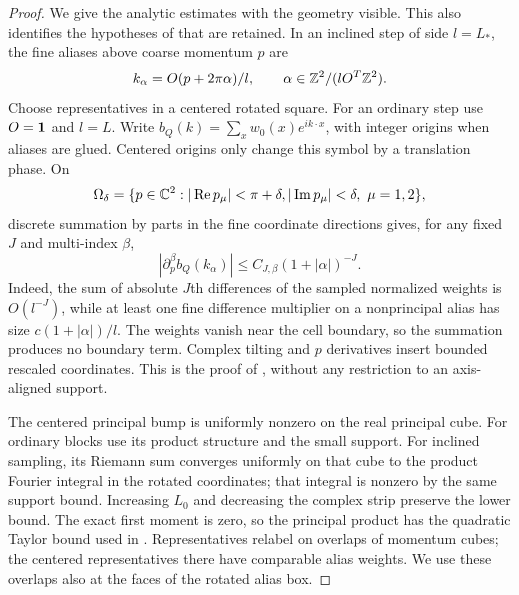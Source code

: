 \begin{proof}
We give the analytic estimates with the geometry visible.  This also
identifies the hypotheses of  that are retained.
In an inclined step of side $l=L_*$, the fine aliases above coarse
momentum $p$ are
\[
 k_\alpha=O(p+2\pi\alpha)/l,
 \qquad \alpha\in\mathbb Z^2/(lO^T\mathbb Z^2).
\]
Choose representatives in a centered rotated square.  For an ordinary
step use $O=\mathbf 1$ and $l=L$.  Write
$b_Q(k)=\sum_xw_0(x)e^{ik\cdot x}$, with integer origins when aliases
are glued.  Centered origins only change this symbol by a translation
phase.  On
\[
 \Omega_\delta=\{p\in\C^2:
       |\operatorname{Re}p_\mu|<\pi+\delta,       |\operatorname{Im}p_\mu|<\delta,\ \mu=1,2\},
\]
discrete summation by parts in the fine coordinate directions gives,
for any fixed $J$ and multi-index $\beta$,
\begin{equation}
 |\partial_p^\beta b_Q(k_\alpha)|
 \le C_{J,\beta}(1+|\alpha|)^{-J}.
 \label{eq:free-bump-decay}
\end{equation}
Indeed, the sum of absolute $J$th differences of the sampled normalized
weights is $O(l^{-J})$, while at least one fine difference multiplier
on a nonprincipal alias has size $c(1+|\alpha|)/l$.  The weights vanish
near the cell boundary, so the summation produces no boundary term.
Complex tilting and $p$ derivatives insert bounded rescaled coordinates.
This is the proof of , without any restriction to
an axis-aligned support.

The centered principal bump is uniformly nonzero on the real principal
cube.  For ordinary blocks use its product structure and the small
support.  For inclined sampling, its Riemann sum converges uniformly on
that cube to the product Fourier integral in the rotated coordinates;
that integral is nonzero by the same support bound.  Increasing $L_0$
and decreasing the complex strip preserve the lower bound.
The exact first moment is zero, so the principal product has the
quadratic Taylor bound used in .
Representatives relabel on overlaps of momentum cubes; the centered
representatives there have comparable alias weights.  We use these
overlaps also at the faces of the rotated alias box.


\end{proof}
